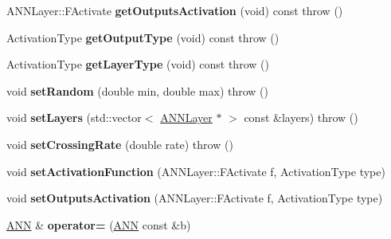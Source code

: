 \begin{DoxyCompactItemize}
\item 
\hypertarget{class_g_a_n_n_1_1_a_n_n_a26b4cbdcbe8bd55986963b26c2e152ee}{}A\+N\+N\+Layer\+::\+F\+Activate {\bfseries get\+Outputs\+Activation} (void) const   throw ()\label{class_g_a_n_n_1_1_a_n_n_a26b4cbdcbe8bd55986963b26c2e152ee}

\item 
\hypertarget{class_g_a_n_n_1_1_a_n_n_ae783b900af56e40c3c59fe0d87d402e7}{}Activation\+Type {\bfseries get\+Output\+Type} (void) const   throw ()\label{class_g_a_n_n_1_1_a_n_n_ae783b900af56e40c3c59fe0d87d402e7}

\item 
\hypertarget{class_g_a_n_n_1_1_a_n_n_a769ffd61d28d8c814b30d629ab496fe1}{}Activation\+Type {\bfseries get\+Layer\+Type} (void) const   throw ()\label{class_g_a_n_n_1_1_a_n_n_a769ffd61d28d8c814b30d629ab496fe1}

\item 
\hypertarget{class_g_a_n_n_1_1_a_n_n_adcedd9edf79df8a07a25d11cdefb5310}{}void {\bfseries set\+Random} (double min, double max)  throw ()\label{class_g_a_n_n_1_1_a_n_n_adcedd9edf79df8a07a25d11cdefb5310}

\item 
\hypertarget{class_g_a_n_n_1_1_a_n_n_aae6cc0117e368dec728e5164fd4877cc}{}void {\bfseries set\+Layers} (std\+::vector$<$ \hyperlink{class_g_a_n_n_1_1_a_n_n_layer}{A\+N\+N\+Layer} $\ast$ $>$ const \&layers)  throw ()\label{class_g_a_n_n_1_1_a_n_n_aae6cc0117e368dec728e5164fd4877cc}

\item 
\hypertarget{class_g_a_n_n_1_1_a_n_n_a4476dd0e4d95747cae5489db42639190}{}void {\bfseries set\+Crossing\+Rate} (double rate)  throw ()\label{class_g_a_n_n_1_1_a_n_n_a4476dd0e4d95747cae5489db42639190}

\item 
\hypertarget{class_g_a_n_n_1_1_a_n_n_a416cb5c5b0d916a9f2ed005494f07be6}{}void {\bfseries set\+Activation\+Function} (A\+N\+N\+Layer\+::\+F\+Activate f, Activation\+Type type)\label{class_g_a_n_n_1_1_a_n_n_a416cb5c5b0d916a9f2ed005494f07be6}

\item 
\hypertarget{class_g_a_n_n_1_1_a_n_n_acc21816e2cb7543eb64d01d9f4a2e30a}{}void {\bfseries set\+Outputs\+Activation} (A\+N\+N\+Layer\+::\+F\+Activate f, Activation\+Type type)\label{class_g_a_n_n_1_1_a_n_n_acc21816e2cb7543eb64d01d9f4a2e30a}

\item 
\hypertarget{class_g_a_n_n_1_1_a_n_n_ad1891b9081a45caf8ce4b4d5646d210d}{}\hyperlink{class_g_a_n_n_1_1_a_n_n}{A\+N\+N} \& {\bfseries operator=} (\hyperlink{class_g_a_n_n_1_1_a_n_n}{A\+N\+N} const \&b)\label{class_g_a_n_n_1_1_a_n_n_ad1891b9081a45caf8ce4b4d5646d210d}


\end{DoxyCompactItemize}
